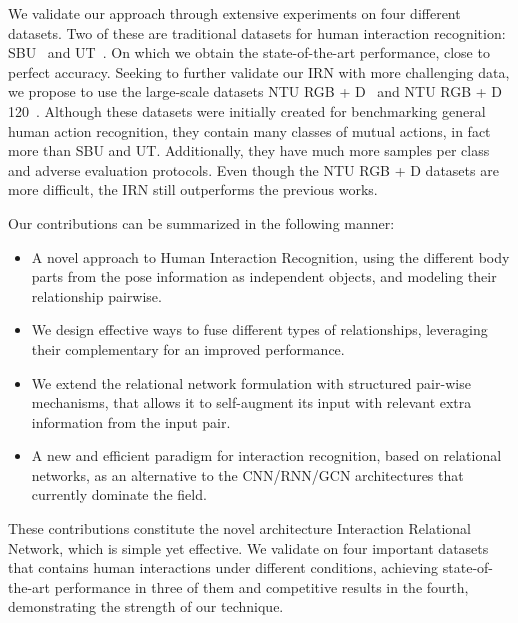 \documentclass[journal,twoside]{IEEEtran}
\begin{document}
We validate our approach through extensive experiments on four different datasets.
Two of these are traditional datasets for human interaction recognition: SBU~\cite{Yun2012} and UT~\cite{Ryoo2009}. On which we obtain the state-of-the-art performance, close to perfect accuracy.
Seeking to further validate our IRN with more challenging data, we propose to use the large-scale datasets NTU RGB + D~\cite{Shahroudy2016} and NTU RGB + D 120~\cite{Liu2019}.
Although these datasets were initially created for benchmarking general human action recognition, they contain many classes of mutual actions, in fact more than SBU and UT.
Additionally, they have much more samples per class and adverse evaluation protocols.
Even though the NTU RGB + D datasets are more difficult, the IRN still outperforms the previous works.


Our contributions can be summarized in the following manner:
\begin{itemize}
	\item A novel approach to Human Interaction Recognition, using the different body parts from the pose information as independent objects, and modeling their relationship pairwise. 
	\item We design effective ways to fuse different types of relationships, leveraging their complementary for an improved performance.
    \item We extend the relational network formulation with structured pair-wise mechanisms, that allows it to self-augment its input with relevant extra information from the input pair.
	\item A new and efficient paradigm for interaction recognition, based on relational networks, as an alternative to the CNN/RNN/GCN architectures that currently dominate the field.
\end{itemize}
These contributions constitute the novel architecture Interaction Relational Network, which is simple yet effective. 
We validate on four important datasets that contains human interactions under different conditions, achieving state-of-the-art performance in three of them and competitive results in the fourth, demonstrating the strength of our technique.
\end{document}
